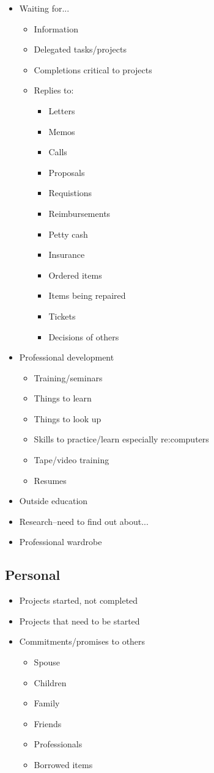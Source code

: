 \documentclass[10pt,landscape]{article}
\begin{document}
\begin{multicols}{3}
\begin{itemize}
\item Waiting for... \begin{itemize}
\item Information 
\item Delegated tasks/projects 
\item Completions critical to projects 
\item Replies to: \begin{itemize}
\item Letters 
\item Memos 
\item Calls 
\item Proposals 
\item Requistions 
\item Reimbursements 
\item Petty cash 
\item Insurance 
\item Ordered items 
\item Items being repaired 
\item Tickets 
\item Decisions of others 

\end{itemize}


\end{itemize}

\item Professional development \begin{itemize}
\item Training/seminars 
\item Things to learn 
\item Things to look up 
\item Skills to practice/learn especially re:computers 
\item Tape/video training 
\item Resumes 

\end{itemize}

\item Outside education 
\item Research--need to find out about... 
\item Professional wardrobe 

\end{itemize}
\subsection*{Personal}
\begin{itemize}
\item Projects started, not completed 
\item Projects that need to be started 
\item Commitments/promises to others \begin{itemize}
\item Spouse 
\item Children 
\item Family 
\item Friends 
\item Professionals 
\item Borrowed items 


\end{itemize}
\end{itemize}
\end{multicols}
\end{document}
